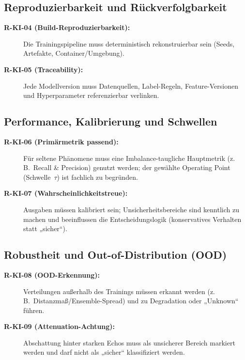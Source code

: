 \subsection{Reproduzierbarkeit und Rückverfolgbarkeit}
\begin{description}
  \item[\textbf{R-KI-04 (Build-Reproduzierbarkeit):}] Die Trainingspipeline muss deterministisch rekonstruierbar sein (Seeds, Artefakte, Container/Umgebung).\\

  \item[\textbf{R-KI-05 (Traceability):}] Jede Modellversion muss Datenquellen, Label-Regeln, Feature-Versionen und Hyperparameter referenzierbar verlinken.\\
\end{description}

\subsection{Performance, Kalibrierung und Schwellen}
\begin{description}
  \item[\textbf{R-KI-06 (Primärmetrik passend):}] Für seltene Phänomene muss eine Imbalance-taugliche Hauptmetrik (z.\,B.\ Recall \& Precision) genutzt werden; der gewählte Operating Point (Schwelle~$\tau$) ist fachlich zu begründen.\\

  \item[\textbf{R-KI-07 (Wahrscheinlichkeitstreue):}] Ausgaben müssen kalibriert sein; Unsicherheitsbereiche sind kenntlich zu machen und beeinflussen die Entscheidungslogik (konservatives Verhalten statt „sicher“).\\
\end{description}

\subsection{Robustheit und Out-of-Distribution (OOD)}
\begin{description}
  \item[\textbf{R-KI-08 (OOD-Erkennung):}] Verteilungen außerhalb des Trainings müssen erkannt werden (z.\,B.\ Distanzmaß/Ensemble-Spread) und zu Degradation oder „Unknown“ führen.\\

  \item[\textbf{R-KI-09 (Attenuation-Achtung):}] Abschattung hinter starken Echos muss als unsicherer Bereich markiert werden und darf nicht als „sicher“ klassifiziert werden.\\
\end{description}

